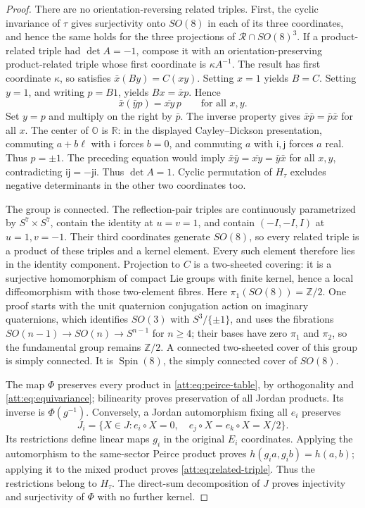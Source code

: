 \documentclass[11pt]{article}
\theoremstyle{definition}
\begin{document}
\begin{proof}
There are no orientation-reversing related triples. First, the cyclic
invariance of $\tau$ gives surjectivity onto $SO(8)$ in each of its
three coordinates, and hence the same holds for the three projections
of $\mathcal R\cap SO(8)^3$. If a product-related triple had
$\det A=-1$, compose it with an orientation-preserving product-related
triple whose first coordinate is $\kappa A^{-1}$. The result has first
coordinate $\kappa$, so satisfies $\bar x(By)=C(xy)$.
Setting $x=1$ yields $B=C$. Setting $y=1$, and writing $p=B1$, yields
$Bx=\bar x p$. Hence
\[
 \bar x(\bar y p)=\overline{xy}\,p\qquad\text{for all }x,y.
\]
Set $y=p$ and multiply on the right by $\bar p$. The inverse property
gives $\bar x\bar p=\bar p\bar x$ for all $x$. The center of
$\mathbb O$ is $\mathbb R$: in the displayed Cayley--Dickson
presentation, commuting $a+b\ell$ with $\mathsf i$ forces $b=0$,
and commuting $a$ with $\mathsf i,\mathsf j$ forces $a$ real.
Thus $p=\pm1$. The preceding equation would imply
$\bar x\bar y=\overline{xy}=\bar y\bar x$ for all $x,y$,
contradicting $\mathsf i\mathsf j=-\mathsf j\mathsf i$.
Thus $\det A=1$. Cyclic permutation of $H_\tau$ excludes negative
determinants in the other two coordinates too.

The group is connected. The reflection-pair triples are continuously
parametrized by $S^7\times S^7$, contain the identity at $u=v=1$,
and contain $(-I,-I,I)$ at $u=1,v=-1$. Their third coordinates
generate $SO(8)$, so every related triple is a product of these
triples and a kernel element. Every such element therefore lies in
the identity component. Projection to $C$ is a two-sheeted covering:
it is a surjective homomorphism of compact Lie groups with finite
kernel, hence a local diffeomorphism with those two-element fibres.
Here $\pi_1(SO(8))=\mathbb Z/2$. One proof starts with the unit
quaternion conjugation action on imaginary quaternions, which
identifies $SO(3)$ with $S^3/\{\pm1\}$, and uses the fibrations
$SO(n-1)\to SO(n)\to S^{n-1}$ for $n\ge4$; their bases have zero
$\pi_1$ and $\pi_2$, so the fundamental group remains $\mathbb Z/2$.
A connected two-sheeted cover of this group is simply connected.
It is $\operatorname{Spin}(8)$, the simply connected cover of $SO(8)$.

The map $\Phi$ preserves every product in
\eqref{att:eq:peirce-table}, by orthogonality and
\eqref{att:eq:equivariance}; bilinearity proves preservation of all
Jordan products. Its inverse is $\Phi(g^{-1})$. Conversely, a Jordan
automorphism fixing all $e_i$ preserves
\[
 J_i=\{X\in J:e_i\circ X=0,\quad e_j\circ X=e_k\circ X=X/2\}.
\]
Its restrictions define linear maps $g_i$ in the original $E_i$
coordinates. Applying the automorphism to the same-sector Peirce
product proves $h(g_i a,g_i b)=h(a,b)$; applying it to the mixed
product proves \eqref{att:eq:related-triple}. Thus the restrictions
belong to $H_\tau$. The direct-sum decomposition of $J$ proves
injectivity and surjectivity of $\Phi$ with no further kernel.
\end{proof}
\end{document}
